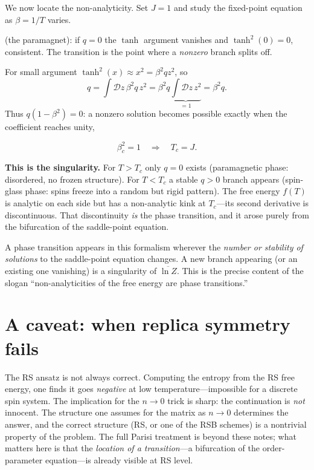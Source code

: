 \documentclass[nobib,justified]{tufte-handout}
\newcommand{\dbar}[1]{\overline{#1}}
\newcommand{\Dz}{\mathcal{D}z}
\begin{document}
We now locate the non-analyticity. Set $J=1$ and study the fixed-point
equation as $\beta=1/T$ varies.

 (the paramagnet): if $q=0$ the
$\tanh$ argument vanishes and $\tanh^2(0)=0$, consistent. The transition is
the point where a \emph{nonzero} branch splits off.

 For small argument
$\tanh^2(x)\approx x^2=\beta^2 q z^2$, so
\[
  q=\int\Dz\,\beta^2 q\,z^2
   =\beta^2 q\underbrace{\int\Dz\,z^2}_{=1}
   =\beta^2 q .
\]
Thus $q(1-\beta^2)=0$: a nonzero solution becomes possible exactly when
the coefficient reaches unity,
\begin{keyresult}
\[
  \beta_c^2=1 \quad\Longrightarrow\quad T_c=J .
\]
\end{keyresult}
\noindent
\textbf{This is the singularity.} For $T>T_c$ only $q=0$ exists
(paramagnetic phase: disordered, no frozen structure). For $T<T_c$ a stable
$q>0$ branch appears (spin-glass phase: spins freeze into a random but
rigid pattern). The free energy $f(T)$ is analytic on each side but has a
non-analytic kink at $T_c$---its second derivative is discontinuous. That
discontinuity \emph{is} the phase transition, and it arose purely from the
bifurcation of the saddle-point equation.

 A phase transition appears in this
formalism wherever the \emph{number or stability of solutions} to the
saddle-point equation changes. A new branch appearing (or an existing one
vanishing) is a singularity of $\dbar{\ln Z}$. This is the precise content
of the slogan ``non-analyticities of the free energy are phase
transitions.''

\section{A caveat: when replica symmetry fails}

The RS ansatz is not always correct. Computing the entropy from the RS free
energy, one finds it goes \emph{negative} at low temperature---impossible
for a discrete spin system. The implication for the
$n\to0$ trick is sharp: the continuation is \emph{not} innocent. The
structure one assumes for the matrix as $n\to0$ determines the answer, and
the correct structure (RS, or one of the RSB schemes) is a nontrivial
property of the problem. The full Parisi treatment is beyond these notes;
what matters here is that the \emph{location of a transition}---a bifurcation
of the order-parameter equation---is already visible at RS level.
\end{document}
